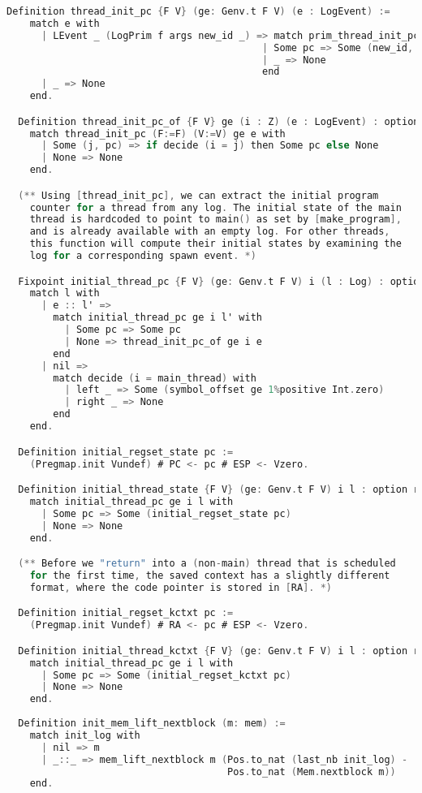 \begin{lstlisting}[language=C]
  Definition thread_init_pc {F V} (ge: Genv.t F V) (e : LogEvent) :=
    match e with
      | LEvent _ (LogPrim f args new_id _) => match prim_thread_init_pc ge f args with 
                                            | Some pc => Some (new_id, pc)
                                            | _ => None
                                            end
      | _ => None
    end.

  Definition thread_init_pc_of {F V} ge (i : Z) (e : LogEvent) : option val :=
    match thread_init_pc (F:=F) (V:=V) ge e with
      | Some (j, pc) => if decide (i = j) then Some pc else None
      | None => None
    end.

  (** Using [thread_init_pc], we can extract the initial program
    counter for a thread from any log. The initial state of the main
    thread is hardcoded to point to main() as set by [make_program],
    and is already available with an empty log. For other threads,
    this function will compute their initial states by examining the
    log for a corresponding spawn event. *)

  Fixpoint initial_thread_pc {F V} (ge: Genv.t F V) i (l : Log) : option val :=
    match l with
      | e :: l' =>
        match initial_thread_pc ge i l' with
          | Some pc => Some pc
          | None => thread_init_pc_of ge i e
        end
      | nil =>
        match decide (i = main_thread) with
          | left _ => Some (symbol_offset ge 1%positive Int.zero)
          | right _ => None
        end
    end.

  Definition initial_regset_state pc :=
    (Pregmap.init Vundef) # PC <- pc # ESP <- Vzero.

  Definition initial_thread_state {F V} (ge: Genv.t F V) i l : option regset :=
    match initial_thread_pc ge i l with
      | Some pc => Some (initial_regset_state pc)
      | None => None
    end.

  (** Before we "return" into a (non-main) thread that is scheduled
    for the first time, the saved context has a slightly different
    format, where the code pointer is stored in [RA]. *)

  Definition initial_regset_kctxt pc :=
    (Pregmap.init Vundef) # RA <- pc # ESP <- Vzero.

  Definition initial_thread_kctxt {F V} (ge: Genv.t F V) i l : option regset :=
    match initial_thread_pc ge i l with
      | Some pc => Some (initial_regset_kctxt pc)
      | None => None
    end.
    
  Definition init_mem_lift_nextblock (m: mem) :=
    match init_log with
      | nil => m
      | _::_ => mem_lift_nextblock m (Pos.to_nat (last_nb init_log) -
                                      Pos.to_nat (Mem.nextblock m))
    end.

\end{lstlisting}

